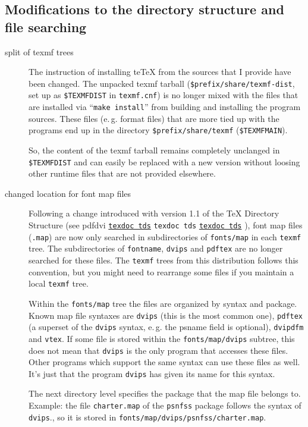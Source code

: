 \documentclass[11pt,a4paper]{article}
\newcommand{\pdfext}{pdf}
\newcommand{\dviext}{dvi}
\newcommand{\dlink}[3]{%
  \ifpdf
    \ifx\pdfext#3
      \href{#1/#2.#3}{\texttt{texdoc #2}}%
    \else
      \texttt{texdoc #2}%
    \fi
  \else
     \href{#1/#2.#3}{\mbox{\texttt{texdoc #2}}}%
  \fi}
\begin{document}
\subsection{Modifications to the directory structure and file searching}
\begin{description}

\item [split of texmf trees] The instruction of installing te\TeX{}
  from the sources that I provide have been changed. The unpacked
  texmf tarball (\verb+$prefix/share/texmf-dist+, %
  set up as \verb+$TEXMFDIST+ %
  in \verb+texmf.cnf+) is no longer mixed with the files that are
  installed via ``\verb+make install+'' from building and installing
  the program sources. These files (e.\,g. format files) that are more
  tied up with the programs end up in the directory
  \verb+$prefix/share/texmf+ (\verb+$TEXMFMAIN+).
  
  So, the content of the texmf tarball remains completely unclanged
  in \verb+$TEXMFDIST+ %
  and can easily be replaced with a new version without loosing other
  runtime files that are not provided elsewhere.

\item [changed location for font map files] Following a change
  introduced with version 1.1 of the \TeX{} Directory Structure (see
  \dlink{../../../texmf-dist/doc/help}{tds}{\dviext}), font map files
  (\verb+.map+) are now only searched in subdirectories of
  \verb+fonts/map+ in each \verb+texmf+ tree. The subdirectories of
  \verb+fontname+, \verb+dvips+ and \verb+pdftex+ are no longer
  searched for these files. The \verb+texmf+ trees from this
  distribution follows this convention, but you might need to
  rearrange some files if you maintain a local \verb+texmf+ tree.
  
  Within the \verb+fonts/map+ tree the files are organized by syntax
  and package. Known map file syntaxes are \verb+dvips+ (this is the
  most common one), \verb+pdftex+ (a superset of the \verb+dvips+
  syntax, e.\,g. the psname field is optional), \verb+dvipdfm+ and
  \verb+vtex+. If some file is stored within the
  \verb+fonts/map/dvips+ subtree, this does not mean that \verb+dvips+
  is the only program that accesses these files. Other programs which
  support the same syntax can use these files as well. It's just that
  the program \verb+dvips+ has given its name for this syntax.
  
  The next directory level specifies the package that the map file
  belongs to.  Example: the file \verb+charter.map+ of the
  \verb+psnfss+ package follows the syntax of \verb+dvips+., so it is
  stored in \verb+fonts/map/dvips/psnfss/charter.map+.
  

\end{description}
\end{document}

